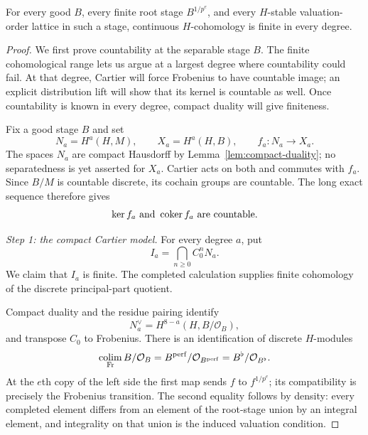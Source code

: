 \begin{proposition}
\label{prop:finite-stage-finiteness}
For every good $B$, every finite root stage $B^{1/p^e}$, and
every $H$-stable valuation-order lattice in such a stage,
continuous $H$-cohomology is finite in every degree.
\end{proposition}

\begin{proof}
We first prove countability at the separable stage $B$.  The finite
cohomological range lets us argue at a largest degree where
countability could fail.  At that degree, Cartier will force
Frobenius to have countable image; an explicit distribution lift will
show that its kernel is countable as well.  Once countability is
known in every degree, compact duality will give finiteness.

Fix a good stage $B$ and set
\begin{equation}
 \label{eq:finite-stage-notation}
 N_a=H^a(H,M),\qquad X_a=H^a(H,B),\qquad
 f_a:N_a\longrightarrow X_a.
\end{equation}
The spaces $N_a$ are compact Hausdorff by
Lemma~\ref{lem:compact-duality}; no separatedness is yet asserted
for $X_a$.  Cartier acts on both and commutes with $f_a$.
Since $B/M$ is countable discrete, its cochain groups are countable.
The long exact sequence therefore gives
\begin{equation}
 \label{eq:countable-defects}
 \ker f_a\ \text{and}\ \operatorname{coker} f_a\ \text{are countable}.
\end{equation}

\smallskip\noindent\emph{Step 1: the compact Cartier model.}
For every degree $a$, put
\[
 I_a=\bigcap_{n\ge0}C_0^nN_a.
\]
We claim that $I_a$ is finite.  The completed calculation supplies
finite cohomology of the discrete principal-part quotient.

Compact duality and the residue pairing identify
\[
 N_a^\vee=H^{8-a}(H,B/\mathcal O_B),
\]
and transpose $C_0$ to Frobenius.  There is an identification of
discrete $H$-modules
\begin{equation}
 \label{eq:principal-parts-perfection}
 \operatorname*{colim}_{\mathrm{Fr}} B/\mathcal O_B
 =B^{\mathrm{perf}}/\mathcal O_{B^{\mathrm{perf}}}
 =B^\flat/\mathcal O_{B^\flat}.
\end{equation}
At the $e$th copy of the left side the first map sends $f$ to
$f^{1/p^e}$; its compatibility is precisely the Frobenius
transition.  The second equality follows by density: every
completed element differs from an element of the root-stage union
by an integral element, and integrality on that union is the
induced valuation condition.


\end{proof}
